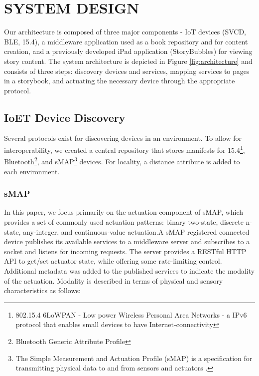 \documentclass{sigchi}
\newcommand*{\quoted}[1]{{\small{\fontfamily{cmss}\selectfont{#1}}}}
\begin{document}
\section{SYSTEM DESIGN}
Our architecture is composed of three major components - IoT devices (SVCD, BLE, 15.4), a middleware application used as a book repository and for content creation, and a previously developed iPad application (StoryBubbles) for viewing story content. The system architecture is depicted in Figure \ref{fig:architecture} and consists of three steps: discovery devices and services, mapping services to pages in a storybook, and actuating the necessary device through the appropriate protocol. 

\subsection{IoET Device Discovery} 
Several protocols exist for discovering devices in an environment. To allow for interoperability, we created a central repository that stores manifests for 15.4\footnote{802.15.4 6LoWPAN - Low power Wireless Personal Area Networks - a IPv6 protocol that enables small devices to have Internet-connectivity},
Bluetooth\footnote{Bluetooth Generic Attribute Profile},
and sMAP\footnote{The Simple Measurement and Actuation Profile (sMAP) is a specification for transmitting physical data to and from sensors and actuators \cite{dawson-haggerty_smap:_2010}.} 
devices. For locality, a distance attribute is added to each environment.


\subsubsection{sMAP}
 In this paper, we focus primarily on the actuation component of sMAP, which provides a set of commonly used actuation patterns: binary two-state, discrete n-state, any-integer, and continuous-value actuation.A sMAP registered connected device publishes its available services to a middleware server and subscribes to a socket and listens for incoming requests. The server provides a RESTful HTTP API to get/set actuator state, while offering some rate-limiting control. Additional metadata was added to the published services to indicate the modality of the actuation. Modality is described in terms of physical and sensory characteristics as follows: 
\quoted{Light, Air, Sound, Small, Heat, Taste, Motion.}
\end{document}
